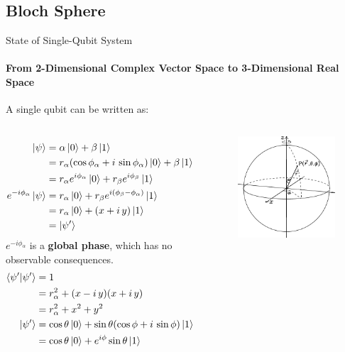 \documentclass{beamer}
\begin{document}
\subsection{Bloch Sphere}
\begin{frame}{State of Single-Qubit System\tiny\cite{blochsphere}}
  \framesubtitle{From 2-Dimensional Complex Vector Space to 3-Dimensional Real Space}
  {\tiny
  A single qubit can be written as:
  \begin{columns}
  \begin{align*}
    \ket{\psi} &= \alpha\ket{0}+\beta\ket{1} \\
               &= r_{\alpha}(\cos\phi_{\alpha} + i\,\sin\phi_{\alpha})\ket{0}+\beta\ket{1} \\
               &= r_{\alpha}e^{i\phi_{\alpha}}\ket{0} + r_{\beta}e^{i\phi_{\beta}}\ket{1}
    \\
    e^{-i\phi_{\alpha}}\ket{\psi} &= r_{\alpha}\ket{0} + r_{\beta}e^{i(\phi_{\beta} - \phi_{\alpha})}\ket{1} \\
                                  &= r_{\alpha}\ket{0} + (x+i\,y)\ket{1} \\
                                  &= \ket{\psi'}
  \end{align*}
  $e^{-i\phi_{\alpha}}$ is a \textbf{global phase}, which has no observable consequences.
  \begin{align*}
    \braket{\psi'|\psi'} &= 1 \\
                         &= r_{\alpha}^2 + (x-i\,y)(x+i\,y) \\
                         &= r_{\alpha}^2 + x^2 + y^2
    \\
    \ket{\psi'} &= \cos\theta\ket{0} + \sin\theta(\cos\phi + i\,\sin\phi)\ket{1} \\
                &= \cos\theta\ket{0}+e^{i\phi}\sin\theta\ket{1}
  \end{align*}
    \begin{figure}
      \includegraphics[scale=0.155]{figures/The-spherical-polar-coordinate-system}

\end{figure}
\end{columns}}
\end{frame}
\end{document}

